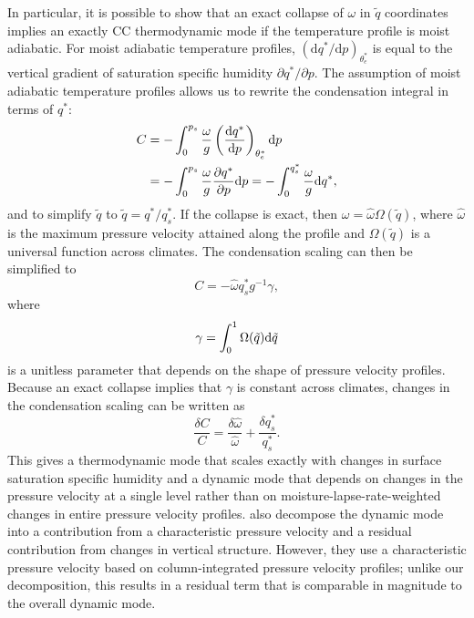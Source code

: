 \documentclass[twocol]{ametsoc}
\begin{document}
In particular, it is possible to show that an exact collapse of $\omega$ in $\tilde{q}$ coordinates implies an exactly CC thermodynamic mode if the temperature profile is moist adiabatic. For moist adiabatic temperature profiles, $\left(\mathrm{d}q^*/\mathrm{d}p \right)_{\theta_e^*}$ is equal to the vertical gradient of saturation specific humidity $\partial q^*/\partial p$. The assumption of moist adiabatic temperature profiles allows us to rewrite the condensation integral in terms of $q^*$:
\begin{equation}
\begin{split}
C &= -\int_{0}^{p_s} \frac{\omega}{g} \left(\frac{{\rm d} q^*}{{\rm d}p}\right)_{\theta_e^*} {\rm d}p \\ &= -\int_{0}^{p_s} \frac{\omega}{g} \frac{\partial q^*}{\partial p} {\rm d}p = -\int_{0}^{q^*_s} \frac{\omega}{g} {\rm d}q^*,
\end{split}
\end{equation}
and to simplify $\tilde{q}$ to $\tilde{q} = q^*/q^*_s$. If the collapse is exact, then $\omega = \hat{\omega} \Omega(\tilde{q})$, where $\hat{\omega}$ is the maximum pressure velocity attained along the profile and $\Omega(\tilde{q})$ is a universal function across climates. The condensation scaling can then be simplified to
\begin{equation}
C = - \hat{\omega} q^*_s  g^{-1} \gamma,
\end{equation}
where
\begin{equation}
    \gamma = \int_{0}^{1} \Omega(\tilde{q}) {\rm d}\tilde{q}
\end{equation}
is a unitless parameter that depends on the shape of pressure velocity profiles. Because an exact collapse implies that $\gamma$ is constant across climates, changes in the condensation scaling can be written as
\begin{equation} \label{eqn:sdecomp}
\frac{\delta C}{C} = \frac{\delta \hat{\omega}}{\hat{\omega}} + \frac{\delta q^*_s}{q^*_s}.
\end{equation}
This gives a thermodynamic mode that scales exactly with changes in surface saturation specific humidity and a dynamic mode that depends on changes in the pressure velocity at a single level rather than on moisture-lapse-rate-weighted changes in entire pressure velocity profiles. \citet{Fildier2017SimultaneousChange} also decompose the dynamic mode into a contribution from a characteristic pressure velocity and a residual contribution from changes in vertical structure. However, they use a characteristic pressure velocity based on column-integrated pressure velocity profiles; unlike our decomposition, this results in a residual term that is comparable in magnitude to the overall dynamic mode.
\end{document}
